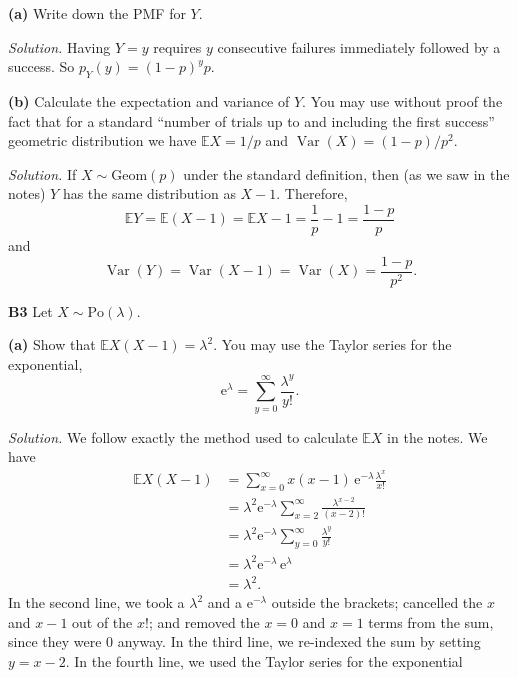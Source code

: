 \documentclass[
  a4paper,
]{book}
\theoremstyle{definition}
\theoremstyle{definition}
\theoremstyle{definition}
\theoremstyle{definition}
\theoremstyle{remark}
\begin{document}
\textbf{(a)} Write down the PMF for \(Y\).

\begin{myanswers}
\emph{Solution.} Having \(Y = y\) requires \(y\) consecutive failures immediately followed by a success. So \(p_Y(y) = (1-p)^y p\).

\end{myanswers}

\textbf{(b)} Calculate the expectation and variance of \(Y\). You may use without proof the fact that for a standard ``number of trials up to and including the first success'' geometric distribution we have \(\mathbb EX = 1/p\) and \(\operatorname{Var}(X) = (1-p)/p^2\).

\begin{myanswers}
\emph{Solution.} If \(X \sim \text{Geom}(p)\) under the standard definition, then (as we saw in the notes) \(Y\) has the same distribution as \(X -1\). Therefore,
\[ \mathbb EY = \mathbb E(X-1) = \mathbb EX - 1 = \frac{1}{p} - 1 = \frac{1-p}{p} \]
and
\[ \operatorname{Var}(Y) = \operatorname{Var}(X -1) = \operatorname{Var}(X) = \frac{1-p}{p^2} .  \]

\end{myanswers}

\textbf{B3} Let \(X \sim \text{Po}(\lambda)\).

\textbf{(a)} Show that \(\mathbb EX(X-1) = \lambda^2\). You may use the Taylor series for the exponential,
\[ \mathrm{e}^\lambda = \sum_{y=0}^\infty \frac{\lambda^y}{y!} . \]

\begin{myanswers}
\emph{Solution.}
We follow exactly the method used to calculate \(\mathbb EX\) in the notes. We have
\begin{align*}
\mathbb EX(X-1) &= \sum_{x=0}^\infty x(x-1)\, \mathrm e^{-\lambda} \frac{\lambda^x}{x!} \\
  &= \lambda^2 \mathrm e^{-\lambda} \sum_{x=2}^\infty \frac{\lambda^{x-2}}{(x - 2)!} \\
  &= \lambda^2 \mathrm e^{-\lambda}\sum_{y=0}^\infty  \frac{\lambda^y}{y!} \\
  &= \lambda^2 \mathrm e^{-\lambda} \, \mathrm e^{\lambda} \\
  &= \lambda^2  .
\end{align*}
In the second line, we took a \(\lambda^2\) and a \(\mathrm e^{-\lambda}\) outside the brackets; cancelled the \(x\) and \(x-1\) out of the \(x!\); and removed the \(x = 0\) and \(x = 1\) terms from the sum, since they were 0 anyway. In the third line, we re-indexed the sum by setting \(y = x - 2\). In the fourth line, we used the Taylor series for the exponential

\end{myanswers}
\end{document}
